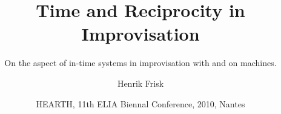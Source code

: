 \documentclass[]{beamer}
\title[Time and Reciprocity]
{%
  Time and Reciprocity in Improvisation
}
\subtitle[In-time performance]
{%
  On the aspect of in-time systems in improvisation with and on machines.
}
\author{Henrik Frisk}
\institute[Lund University]
{
  Malmö Academy of Music, Lund University
}
\date{HEARTH, 11th ELIA Biennal Conference, 2010, Nantes}
\begin{document}
\begin{frame}
  \titlepage
\end{frame}




\end{document}
